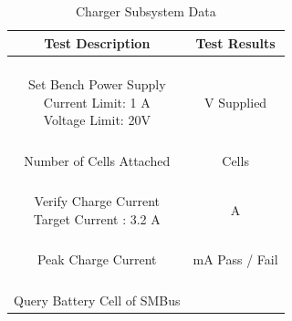 \documentclass[12pt]{article}
\begin{document}
\begin{appendices}
\begin{table}[h!]
\centering
\caption*{Charger Subsystem Data}
\begin{tabular}{ | c | c | }
\hline
\textbf{Test Description} & \textbf{Test Results} \\
\hline
\parbox{0.5\linewidth}{\raggedright \hfill \\[-0.25 em]
Set Bench Power Supply \\ Current Limit: 1 A \\ Voltage Limit: 20V
\hfill \\[0.1 em]} &  \parbox{0.4\linewidth}{\raggedright \hfill \\ [0.7 em] \underline{\hspace{0.625in}} 
V Supplied
 \hfill \\ [0.3 em]} \\ 
\hline
\parbox{0.5\linewidth}{\raggedright \hfill \\[-0.25 em]
Number of Cells Attached
\hfill \\[0.1 em]} &  \parbox{0.4\linewidth}{\raggedright \hfill \\ [0.7 em] \underline{\hspace{0.625in}} 
Cells 
 \hfill \\ [0.3 em]} \\ 
\hline
\parbox{0.5\linewidth}{\raggedright \hfill \\[-0.25 em]
Verify Charge Current \\
Target Current : 3.2 A 
\hfill \\[0.1 em]} &  \parbox{0.4\linewidth}{\raggedright \hfill \\ [0.7 em] \underline{\hspace{0.625in}} 
A
 \hfill \\ [0.3 em]} \\ 
\hline
\parbox{0.5\linewidth}{\raggedright \hfill \\[-0.25 em]
Peak Charge Current
\hfill \\[0.1 em]} &  \parbox{0.4\linewidth}{\raggedright \hfill \\ [0.7 em]
\underline{\hspace{0.625in}} mA
\hspace{0.125 in}Pass \space / \space  Fail \hfill \\ [0.3 em]} \\ 
\hline
\parbox{0.5\linewidth}{\raggedright \hfill \\[-0.25 em]
Query Battery Cell of SMBus
}
\end{tabular}
\end{table}
\end{appendices}
\end{document}
